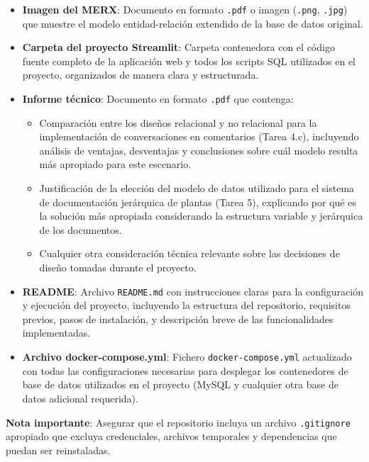 \documentclass[10pt]{article}
\begin{document}
	\begin{itemize}
		\item \textbf{Imagen del MERX}: Documento en formato \texttt{.pdf} o imagen (\texttt{.png}, \texttt{.jpg}) que muestre el modelo entidad-relación extendido de la base de datos original.
		
		\item \textbf{Carpeta del proyecto Streamlit}: Carpeta contenedora con el código fuente completo de la aplicación web y todos los scripts SQL utilizados en el proyecto, organizados de manera clara y estructurada.
		
		\item \textbf{Informe técnico}: Documento en formato \texttt{.pdf} que contenga:
		\begin{itemize}
			\item Comparación entre los diseños relacional y no relacional para la implementación de conversaciones en comentarios (Tarea 4.c), incluyendo análisis de ventajas, desventajas y conclusiones sobre cuál modelo resulta más apropiado para este escenario.
			\item Justificación de la elección del modelo de datos utilizado para el sistema de documentación jerárquica de plantas (Tarea 5), explicando por qué es la solución más apropiada considerando la estructura variable y jerárquica de los documentos.
			\item Cualquier otra consideración técnica relevante sobre las decisiones de diseño tomadas durante el proyecto.
		\end{itemize}
		
		\item \textbf{README}: Archivo \texttt{README.md} con instrucciones claras para la configuración y ejecución del proyecto, incluyendo la estructura del repositorio, requisitos previos, pasos de instalación, y descripción breve de las funcionalidades implementadas.
		
		\item \textbf{Archivo docker-compose.yml}: Fichero \texttt{docker-compose.yml} actualizado con todas las configuraciones necesarias para desplegar los contenedores de base de datos utilizados en el proyecto (MySQL y cualquier otra base de datos adicional requerida).
	\end{itemize}
	
	\vspace{2mm}
	
	\textbf{Nota importante}: Asegurar que el repositorio incluya un archivo \texttt{.gitignore} apropiado que excluya credenciales, archivos temporales y dependencias que puedan ser reinstaladas.
	
\end{document}
